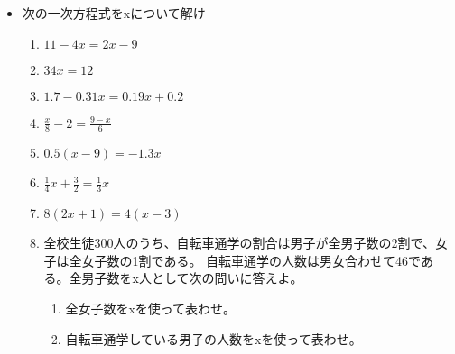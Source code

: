 \documentclass[a4paper,fleqn,papersize,15pt]{jsarticle}
\begin{document}
 \begin{itemize}
   \item 次の一次方程式をxについて解け
   \begin{enumerate}
\item $11-4x=2x-9$ \begin{flushright}\framebox[8em]{\rule{0pt}{6ex}}\end{flushright} %
\item $34x=12$ \begin{flushright}\framebox[8em]{\rule{0pt}{6ex}}\end{flushright} %
\item $1.7-0.31x=0.19x+0.2$ \begin{flushright}\framebox[8em]{\rule{0pt}{6ex}}\end{flushright} %
\item $\frac{x}{8} -2= \frac{9-x}{6}$ \begin{flushright}\framebox[8em]{\rule{0pt}{6ex}}\end{flushright} %
\item $0.5(x-9)=-1.3x$ \begin{flushright}\framebox[8em]{\rule{0pt}{6ex}}\end{flushright} %
\item $\frac{1}{4} x+ \frac{3}{2} = \frac{1}{3} x$ \begin{flushright}\framebox[8em]{\rule{0pt}{6ex}}\end{flushright} %
\item $8(2x+1)=4(x-3)$ \begin{flushright}\framebox[8em]{\rule{0pt}{6ex}}\end{flushright} %
\item 全校生徒300人のうち、自転車通学の割合は男子が全男子数の2割で、女子は全女子数の1割である。 自転車通学の人数は男女合わせて46である。全男子数をx人として次の問いに答えよ。 \vfill \begin{flushright}\framebox[8em]{\rule{0pt}{6ex}}\end{flushright} %
\begin{enumerate}
\item 全女子数をxを使って表わせ。 \vfill \begin{flushright}\framebox[8em]{\rule{0pt}{6ex}}\end{flushright} %
\item 自転車通学している男子の人数をxを使って表わせ。 \vfill \begin{flushright}\framebox[8em]{\rule{0pt}{6ex}}\end{flushright} %

\end{enumerate}
\end{enumerate}
\end{itemize}
\end{document}
